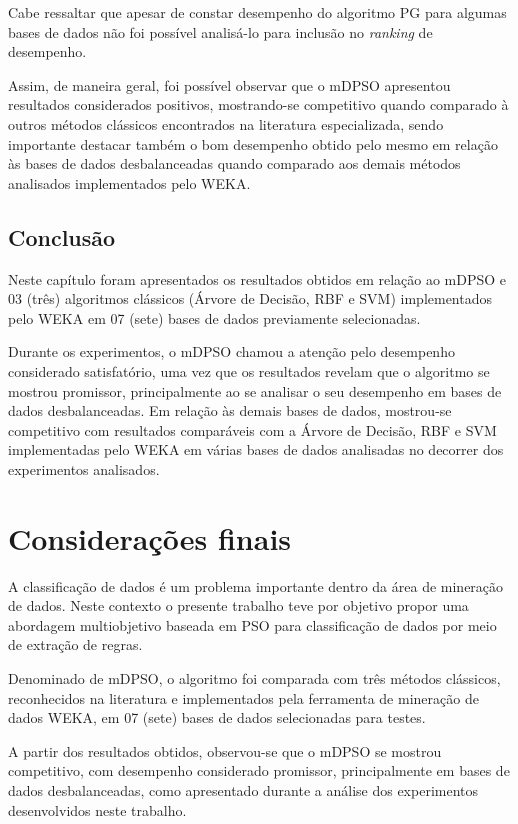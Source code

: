 \documentclass[
	12pt,				%
	openany,			%
	oneside,	
	a4paper,			%
	brazil,				%
	]{unimontes-ppgmsc-abntex2}
\begin{document}
Cabe ressaltar que apesar de constar desempenho do algoritmo PG para algumas bases de dados não foi possível analisá-lo para inclusão no {\em ranking} de desempenho. 

Assim, de maneira geral, foi possível observar que o mDPSO apresentou resultados considerados positivos, mostrando-se competitivo quando comparado à outros métodos clássicos encontrados na literatura especializada, sendo importante destacar também o bom desempenho obtido pelo mesmo em relação às bases de dados desbalanceadas quando comparado aos demais métodos analisados implementados pelo WEKA.

\section{Conclusão}

Neste capítulo foram apresentados os resultados obtidos em relação ao mDPSO e 03 (três) algoritmos clássicos (Árvore de Decisão, RBF e SVM) implementados pelo WEKA em 07 (sete) bases de dados previamente selecionadas. 

Durante os experimentos, o mDPSO chamou a atenção pelo desempenho considerado satisfatório, uma vez que os resultados revelam que o algoritmo se mostrou promissor, principalmente ao se analisar o seu desempenho em bases de dados desbalanceadas. Em relação às demais bases de dados, mostrou-se competitivo com resultados comparáveis com a Árvore de Decisão, RBF e SVM implementadas pelo WEKA em várias bases de dados analisadas no decorrer dos experimentos analisados.


\chapter[Considerações Finais]{Considerações finais}
\label{ch:cons_finais}

A classificação de dados é um problema importante dentro da área de mineração de dados. Neste contexto o presente trabalho teve por objetivo propor uma abordagem multiobjetivo baseada em PSO para classificação de dados por meio de extração de regras. 

Denominado de mDPSO, o algoritmo foi comparada com três métodos clássicos, reconhecidos na literatura e implementados pela ferramenta de mineração de dados WEKA, em 07 (sete) bases de dados selecionadas para testes. 

A partir dos resultados obtidos, observou-se que o mDPSO se mostrou competitivo, com desempenho considerado promissor, principalmente em bases de dados desbalanceadas, como apresentado durante a análise dos experimentos desenvolvidos neste trabalho.
\end{document}
